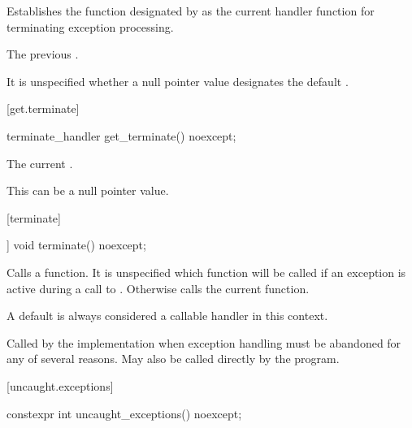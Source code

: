 \begin{itemdescr}
\pnum
\effects
Establishes the function designated by  as the current
handler function for terminating exception processing.

\pnum
\returns
The previous .

\pnum
\remarks
It is unspecified whether a null pointer value designates the default
.
\end{itemdescr}

[get.terminate]{}

%
\begin{itemdecl}
terminate_handler get_terminate() noexcept;
\end{itemdecl}

\begin{itemdescr}
\pnum
\returns
The current .
\begin{note}
This can be a null pointer value.
\end{note}
\end{itemdescr}

[terminate]{}

%
\begin{itemdecl}
[[noreturn]] void terminate() noexcept;
\end{itemdecl}

\begin{itemdescr}
\pnum
\effects
Calls a  function. It is unspecified which
 function will be called if an exception is active
during a call to .
Otherwise calls the current  function.
\begin{note}
A
default  is always considered a callable handler in
this context.
\end{note}

\pnum
\remarks
Called by the implementation when exception
handling must be abandoned for any of several reasons.
May also be called directly by the program.
\end{itemdescr}

[uncaught.exceptions]{}

%
\begin{itemdecl}
constexpr int uncaught_exceptions() noexcept;
\end{itemdecl}


